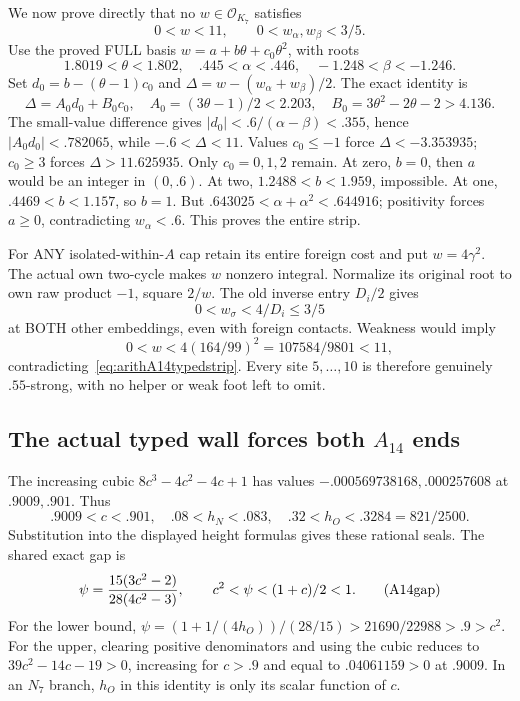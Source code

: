 We now prove directly that no
\(w\in\mathcal O_{K_7}\) satisfies
\[
                    0<w<11,\qquad0<w_\alpha,w_\beta<3/5 .
\tag{A14strip}\label{eq:arithA14typedstrip}
\]
Use the proved FULL basis
\(w=a+b\theta+c_0\theta^2\), with roots
\[
 1.8019<\theta<1.802,\quad .445<\alpha<.446,\quad
                            -1.248<\beta<-1.246 .
\]
Set \(d_0=b-(\theta-1)c_0\) and
\(\Delta=w-(w_\alpha+w_\beta)/2\).
The exact identity is
\[
 \Delta=A_0d_0+B_0c_0,\quad
 A_0=(3\theta-1)/2<2.203,\quad
 B_0=3\theta^2-2\theta-2>4.136 .
\]
The small-value difference gives
\(|d_0|<.6/(\alpha-\beta)<.355\),
hence \(|A_0d_0|<.782065\), while
\(-.6<\Delta<11\).
Values \(c_0\le-1\) force
\(\Delta<-3.353935\);
\(c_0\ge3\) forces \(\Delta>11.625935\).
Only \(c_0=0,1,2\) remain.
At zero, \(b=0\), then \(a\) would be an
integer in \((0,.6)\).
At two, \(1.2488<b<1.959\), impossible.
At one, \(.4469<b<1.157\), so \(b=1\).
But \(.643025<\alpha+\alpha^2<.644916\);
positivity forces \(a\ge0\), contradicting
\(w_\alpha<.6\).
This proves the entire strip.

For ANY isolated-within-\(A\) cap retain
its entire foreign cost and put \(w=4\gamma^2\).
The actual own two-cycle makes \(w\)
nonzero integral.
Normalize its original root to own raw
product \(-1\), square \(2/w\).
The old inverse entry \(D_i/2\) gives
\[
                     0<w_\sigma<4/D_i\le3/5
\]
at BOTH other embeddings, even with
foreign contacts.
Weakness would imply
\[
           0<w<4(164/99)^2=107584/9801<11,
\]
contradicting~\eqref{eq:arithA14typedstrip}.
Every site \(5,\ldots,10\) is therefore
genuinely \(.55\)-strong, with no helper
or weak foot left to omit.

\subsection{The actual typed wall forces both \(A_{14}\) ends}
\label{app:arithA14typedends}

The increasing cubic \(8c^3-4c^2-4c+1\)
has values \(-.000569738168,.000257608\)
at \(.9009,.901\).
Thus
\[
 .9009<c<.901,\quad
 .08<h_N<.083,\quad .32<h_O<.3284=821/2500 .
\]
Substitution into the displayed height
formulas gives these rational seals.
The shared exact gap is
\[
 \psi={15(3c^2-2)\over28(4c^2-3)},\qquad
                         c^2<\psi<(1+c)/2<1 .
\tag{A14gap}\label{eq:arithA14typedgap}
\]
For the lower bound,
\(\psi=(1+1/(4h_O))/(28/15)>21690/22988>.9>c^2\).
For the upper, clearing positive denominators
and using the cubic reduces to
\(39c^2-14c-19>0\), increasing for \(c>.9\)
and equal to \(.04061159>0\) at \(.9009\).
In an \(N_7\) branch, \(h_O\) in this
identity is only its scalar function of \(c\).

